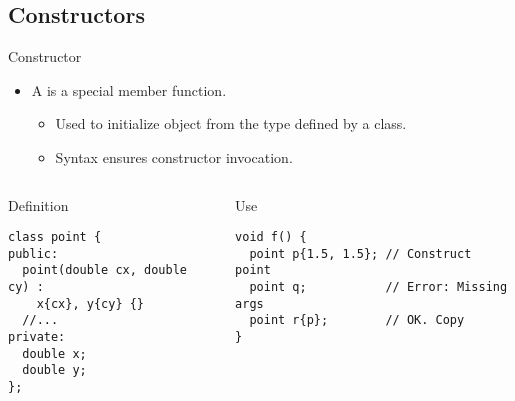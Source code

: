 \subsection{Constructors}

\begin{frame}[t,fragile]{Constructor}
\begin{itemize}
  \item A  is a special member function.
    \begin{itemize}
      \item Used to initialize object from the type defined by a class.
      \item Syntax ensures constructor invocation. 
    \end{itemize}
\end{itemize}
\vfill
\begin{columns}[T]

\begin{block}{Definition}
\begin{lstlisting}
class point {
public:
  point(double cx, double cy) : 
    x{cx}, y{cy} {}
  //...
private:
  double x;
  double y;
};
\end{lstlisting}
\end{block}

\begin{block}{Use}
\begin{lstlisting}
void f() {
  point p{1.5, 1.5}; // Construct point
  point q;           // Error: Missing args
  point r{p};        // OK. Copy
}
\end{lstlisting}
\end{block}

\end{columns}
\end{frame}
